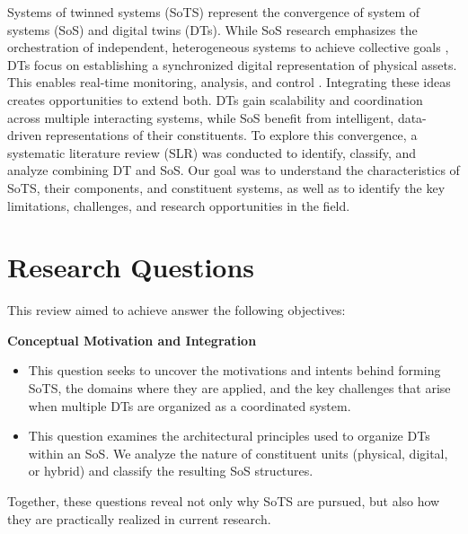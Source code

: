 Systems of twinned systems (SoTS) represent the convergence of system of systems (SoS) and digital twins (DTs). While SoS research emphasizes the orchestration of independent, heterogeneous systems to achieve collective goals \cite{maier1998architecting}, DTs focus on establishing a synchronized digital representation of physical assets. This enables real-time monitoring, analysis, and control \cite{kritzinger2018digital, tao2018digital}. Integrating these ideas creates opportunities to extend both. DTs gain scalability and coordination across multiple interacting systems, while SoS benefit from intelligent, data-driven representations of their constituents. To explore this convergence, a systematic literature review (SLR) was conducted to identify, classify, and analyze combining DT and SoS. Our goal was to understand the characteristics of SoTS, their components, and constituent systems, as well as to identify the key limitations, challenges, and research opportunities in the field.


\section{Research Questions}\label{sec:literature-review-rqs}
This review aimed to achieve answer the following objectives:

\vspace{0.5em}
\noindent \textbf{\large Conceptual Motivation and Integration}
\vspace{-1em}

\begin{itemize}
    \item {} This question seeks to uncover the motivations and intents behind forming SoTS, the domains where they are applied, and the key challenges that arise when multiple DTs are organized as a coordinated system.
    \item {} This question examines the architectural principles used to organize DTs within an SoS. We analyze the nature of constituent units (physical, digital, or hybrid) and classify the resulting SoS structures.
\end{itemize}
    Together, these questions reveal not only why SoTS are pursued, but also how they are practically realized in current research.


